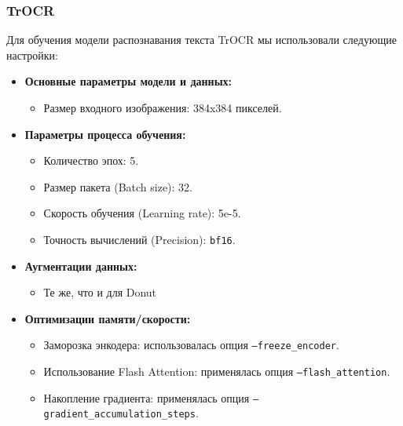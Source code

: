 \documentclass[12pt, a4paper]{article}
\theoremstyle{definition}
\theoremstyle{remark}
\begin{document}
	\subsubsection{TrOCR}
	Для обучения модели распознавания текста TrOCR мы использовали следующие настройки:
	\begin{itemize}
		\item \textbf{Основные параметры модели и данных:}
		\begin{itemize}
			\item Размер входного изображения: 384x384 пикселей.
		\end{itemize}
		\item \textbf{Параметры процесса обучения:}
		\begin{itemize}
			\item Количество эпох: 5.
			\item Размер пакета (Batch size): 32.
			\item Скорость обучения (Learning rate): 5e-5.
			\item Точность вычислений (Precision): \texttt{bf16}.
		\end{itemize}
		\item \textbf{Аугментации данных:}
		\begin{itemize}
			\item Те же, что и для Donut
		\end{itemize}
		\item \textbf{Оптимизации памяти/скорости:}
		\begin{itemize}
			\item Заморозка энкодера: использовалась опция \texttt{--freeze\_encoder}.
			\item Использование Flash Attention: применялась опция \texttt{--flash\_attention}.
			\item Накопление градиента: применялась опция \texttt{--gradient\_accumulation\_steps}.
		\end{itemize}
	\end{itemize}
	
\end{document}
